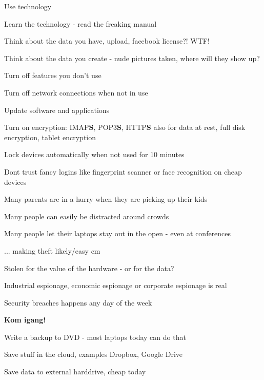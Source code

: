 \documentclass[20pt,landscape,a4paper,footrule]{foils}
\begin{document}

\begin{list1}
\item Use technology
\item Learn the technology - read the freaking manual
\item Think about the data you have, upload, facebook license?! WTF!
\item Think about the data you create - nude pictures taken, where will they show up?
\begin{list2}
\item Turn off features you don't use
\item Turn off network connections when not in use
\item Update software and applications
\item Turn on encryption: IMAP{\bf S}, POP3{\bf S},
  HTTP{\bf S} also for data at rest, full disk encryption, tablet encryption
\item Lock devices automatically when not used for 10 minutes
\item Dont trust fancy logins like fingerprint scanner or face recognition on cheap devices
\end{list2}
\end{list1}



\begin{list1}
\item Many parents are in a hurry when they are picking up their kids
\item Many people can easily be distracted around crowds
\item Many people let their laptops stay out in the open - even at conferences
\item ... making theft likely/easy
 cm
\item Stolen for the value of the hardware - or for the data?
\item Industrial espionage, economic espionage or corporate espionage is real
\end{list1}

\centerline{Security breaches happens any day of the week}


\vskip 3cm
\centerline{\LARGE \bf Kom igang!}

\begin{list2}
\item Write a backup to DVD - most laptops today can do that
\item Save stuff in the cloud, examples Dropbox, Google Drive
\item Save data to external harddrive, cheap today
\end{list2}
\end{document}
